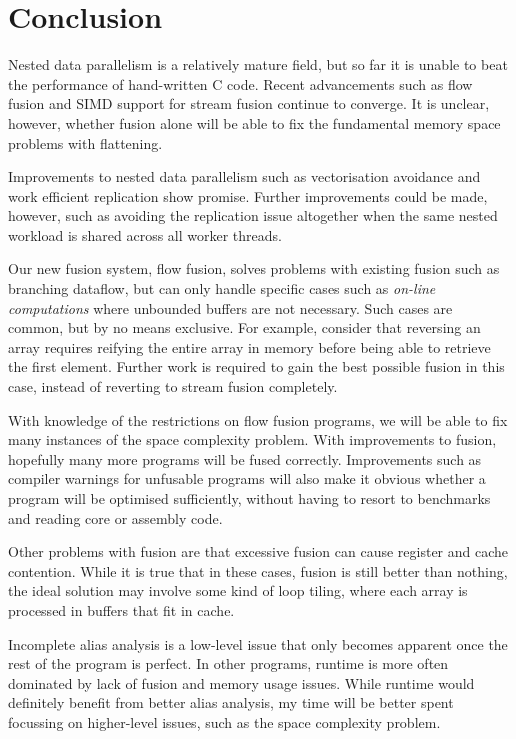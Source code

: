 \section{Conclusion}

Nested data parallelism is a relatively mature field, but so far it is unable to beat the performance of hand-written C code.
Recent advancements such as flow fusion\cite{lippmeier2013flow} and SIMD support for stream fusion\cite{mainland2013haskell}
continue to converge.
It is unclear, however, whether fusion alone will be able to fix the fundamental memory space problems with flattening\cite{lippmeier2012work}.

Improvements to nested data parallelism such as vectorisation avoidance\cite{keller2012vectorisation}
and work efficient replication\cite{lippmeier2012work} show promise.
Further improvements could be made, however, such as avoiding the replication issue altogether when the same nested workload is shared across all worker threads.

Our new fusion system, flow fusion\cite{lippmeier2013flow}, solves problems with existing fusion such as branching dataflow,
but can only handle specific cases such as \emph{on-line computations} where unbounded buffers are not necessary.
Such cases are common, but by no means exclusive.
For example, consider that reversing an array requires reifying the entire array in memory before being able to retrieve the first element.
Further work is required to gain the best possible fusion in this case, instead of reverting to stream fusion completely.

With knowledge of the restrictions on flow fusion programs,
we will be able to fix many instances of the space complexity problem.
With improvements to fusion, hopefully many more programs will be fused correctly.
Improvements such as compiler warnings for unfusable programs will also make
it obvious whether a program will be optimised sufficiently,
without having to resort to benchmarks and reading core or assembly code.

Other problems with fusion are that excessive fusion can cause register and cache contention\cite{song2004improving}.
While it is true that in these cases, fusion is still better than nothing,
the ideal solution may involve some kind of loop tiling\cite{pike2002better},
where each array is processed in buffers that fit in cache.

Incomplete alias analysis is a low-level issue that only becomes apparent once the rest of the program is perfect.
In other programs, runtime is more often dominated by lack of fusion and memory usage issues.
While runtime would definitely benefit from better alias analysis, my time will be better spent focussing on higher-level issues,
such as the space complexity problem.


